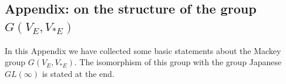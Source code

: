 \documentclass[11pt, a4paper]{article}
\begin{document}


 
\begin{center}
\subsection*{Appendix: on the structure of the group $ G (V_E,V_{*E})$}
\end{center}

In this Appendix we have collected some basic statements about the Mackey group $ G (V_E,V_{*E})$. The isomorphism of this group with the group Japanese $GL(\infty)$ is stated at the end.

\setcounter{snomer}{0}
\renewcommand{\thesnomer}{\arabic{snomer}}
\end{document}
